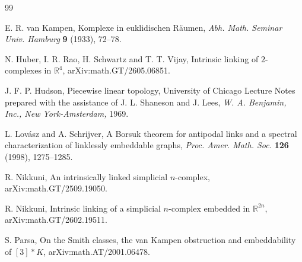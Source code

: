 \documentclass{amsart}
\theoremstyle{definition}
\theoremstyle{remark}
\numberwithin{equation}{section}
\begin{document}
{\begin{thebibliography}{99}







E. R. van Kampen, 
Komplexe in euklidischen R\"{a}umen, \textit{Abh. Math. Seminar Univ. Hamburg} {\bf 9} (1933), 72--78.



N. Huber, I. R. Rao, H. Schwartz and T. T. Vijay, 
Intrinsic linking of $2$-complexes in $\mathbb{R}^{4}$, arXiv:math.GT/2605.06851. 



J. F. P. Hudson, 
Piecewise linear topology, 
University of Chicago Lecture Notes prepared with the assistance of J. L. Shaneson and J. Lees, \textit{W. A. Benjamin, Inc., New York-Amsterdam,} 1969. 




L. Lov\'{a}sz and A. Schrijver, 
A Borsuk theorem for antipodal links and a spectral characterization of linklessly embeddable graphs, \textit{Proc. Amer. Math. Soc.} {\bf 126} (1998), 1275--1285. 






R. Nikkuni, 
An intrinsically linked simplicial $n$-complex, arXiv:math.GT/2509.19050. 



R. Nikkuni, 
Intrinsic linking of a simplicial $n$-complex embedded in $\mathbb{R}^{2n}$, arXiv:math.GT/2602.19511. 


S. Parsa, 
On the Smith classes, the van Kampen obstruction and embeddability of $[3] * K$, arXiv:math.AT/2001.06478. 







\end{thebibliography}}
\end{document}
